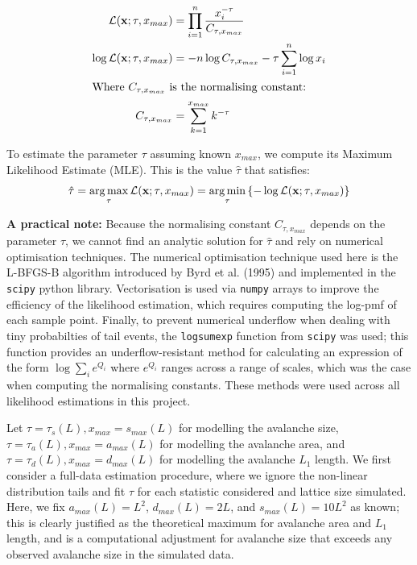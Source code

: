 \begin{align*}
    \mathcal{L}(\mathbf{x}; \tau, x_{max}) &= \prod_{i=1}^n \frac{x_i^{-\tau}}{C_{\tau, x_{max}}} \\
    \log \mathcal{L}(\mathbf{x}; \tau, x_{max}) &= -n \log C_{\tau, x_{max}} -\tau \sum_{i=1}^n \log{x_i} \\
    \intertext{Where $C_{\tau, x_{max}}$ is the normalising constant:}
    C_{\tau, x_{max}} &= \sum_{k=1}^{x_{max}} k^{-\tau}
\end{align*}

To estimate the parameter $\tau$ assuming known $x_{max}$, we compute its Maximum Likelihood Estimate (MLE).
This is the value $\hat{\tau}$ that satisfies:
\[\hat{\tau} = \operatorname*{arg\,max}_{\tau} \mathcal{L}(\mathbf{x}; \tau, x_{max}) = \operatorname*{arg\,min}_{\tau} \left\{- \log \mathcal{L}(\mathbf{x}; \tau, x_{max}) \right\}\]

\textbf{A practical note:} Because the normalising constant $C_{\tau, x_{max}}$ depends on the parameter $\tau$, we cannot find an analytic solution for $\hat{\tau}$ and rely on numerical optimisation techniques.
The numerical optimisation technique used here is the L-BFGS-B algorithm introduced by Byrd et al. (1995) \cite{byrd1995limited} and implemented in the \texttt{scipy} python library. 
Vectorisation is used via \texttt{numpy} arrays to improve the efficiency of the likelihood estimation, which requires computing the log-pmf of each sample point. 
Finally, to prevent numerical underflow when dealing with tiny probabilties of tail events, the \texttt{logsumexp} function from \texttt{scipy} was used; this function provides an underflow-resistant method for calculating an expression of the form $\log \sum_{i} e^{Q_i}$ where $e^{Q_i}$ ranges across a range of scales, which was the case when computing the normalising constants.
These methods were used across all likelihood estimations in this project.

Let $\tau = \tau_s(L), x_{max} = s_{max}(L)$ for modelling the avalanche size, $\tau = \tau_a(L), x_{max} = a_{max}(L)$ for modelling the avalanche area, and $\tau = \tau_d(L), x_{max} = d_{max}(L)$ for modelling the avalanche $L_1$ length.
We first consider a full-data estimation procedure, where we ignore the non-linear distribution tails and fit $\tau$ for each statistic considered and lattice size simulated. Here, we fix $a_{max}(L) = L^2$, $d_{max}(L) = 2L$, and $s_{max}(L) = 10L^2$ as known; this is clearly justified as the theoretical maximum for avalanche area and $L_1$ length, and is a computational adjustment for avalanche size that exceeds any observed avalanche size in the simulated data.


